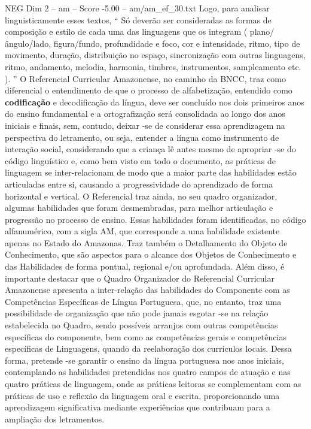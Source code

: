 \begin{textsample}{NEG Dim 2 – am – Score -5.00 – am/am\_ef\_30.txt}
Logo, para analisar linguisticamente esses textos, “ Só deverão ser consideradas as formas de composição e estilo de cada uma das linguagens que os integram ( plano/ângulo/lado, figura/fundo, profundidade e foco, cor e intensidade, ritmo, tipo de movimento, duração, distribuição no espaço, sincronização com outras linguagens, ritmo, andamento, melodia, harmonia, timbres, instrumentos, sampleamento etc. ). ” O Referencial Curricular Amazonense, no caminho da BNCC, traz como diferencial o entendimento de que o processo de alfabetização, entendido como \textbf{codificação} e decodificação da língua, deve ser concluído nos dois primeiros anos do ensino fundamental e a ortografização será consolidada ao longo dos anos iniciais e finais, sem, contudo, deixar -se de considerar essa aprendizagem na perspectiva do letramento, ou seja, entender a língua como instrumento de interação social, considerando que a criança lê antes mesmo de apropriar -se do código linguístico e, como bem visto em todo o documento, as práticas de linguagem se inter-relacionam de modo que a maior parte das habilidades estão articuladas entre si, causando a progressividade do aprendizado de forma horizontal e vertical.
O Referencial traz ainda, no seu quadro organizador, algumas habilidades que foram desmembradas, para melhor articulação e progressão no processo de ensino.
Essas habilidades foram identificadas, no código alfanumérico, com a sigla AM, que corresponde a uma habilidade existente apenas no Estado do Amazonas.
Traz também o Detalhamento do Objeto de Conhecimento, que são aspectos para o alcance dos Objetos de Conhecimento e das Habilidades de forma pontual, regional e/ou aprofundada.
Além disso, é importante destacar que o Quadro Organizador do Referencial Curricular Amazonense apresenta a inter-relação das habilidades do Componente com as Competências Específicas de Língua Portuguesa, que, no entanto, traz uma possibilidade de organização que não pode jamais esgotar -se na relação estabelecida no Quadro, sendo possíveis arranjos com outras competências específicas do componente, bem como as competências gerais e competências específicas de Linguagens, quando da reelaboração dos currículos locais.
Dessa forma, pretende -se garantir o ensino da língua portuguesa nos anos iniciais, contemplando as habilidades pretendidas nos quatro campos de atuação e nas quatro práticas de linguagem, onde as práticas leitoras se complementam com as práticas de uso e reflexão da linguagem oral e escrita, proporcionando uma aprendizagem significativa mediante experiências que contribuam para a ampliação dos letramentos.

\end{textsample}
